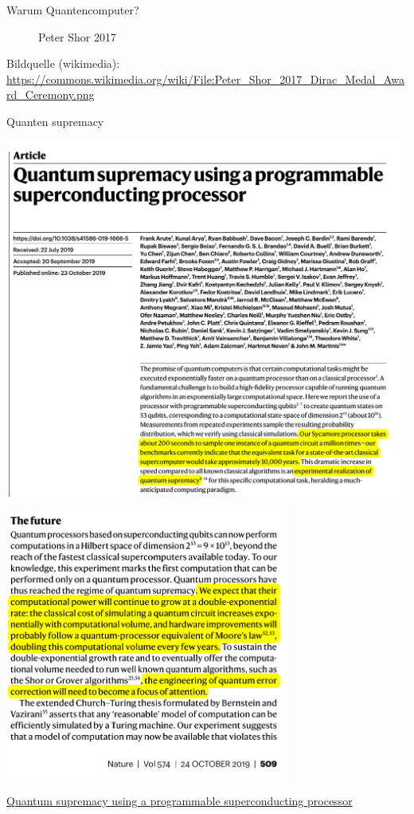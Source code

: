 \documentclass[compress,aspectratio=1610]{beamer}
\begin{document}
\begin{frame}{Warum Quantencomputer?}
\begin{minipage}{0.3\textwidth}
\begin{figure}[h]
    \caption{Peter Shor 2017}
    \end{figure}
  \end{minipage}
  \vfill
  \tiny{Bildquelle (wikimedia): \url{https://commons.wikimedia.org/wiki/File:Peter_Shor_2017_Dirac_Medal_Award_Ceremony.png}}
\end{frame}

\begin{frame}{Quanten supremacy}
  \begin{minipage}{0.45\textwidth}
    \centering
    \includegraphics[width=1.1\textwidth]{figures/Quantum-Supremacy.png}
  \end{minipage}
  \hfill
  \begin{minipage}{0.45\textwidth}
    \centering
    \includegraphics[width=0.7\textwidth]{figures/The-Future.png}
  \end{minipage}
  \vfill
  \tiny{\href{https://www.nature.com/articles/s41586-019-1666-5}{Quantum supremacy using a programmable superconducting processor} \cite{Arute2019}}
\end{frame}    
\end{document}
